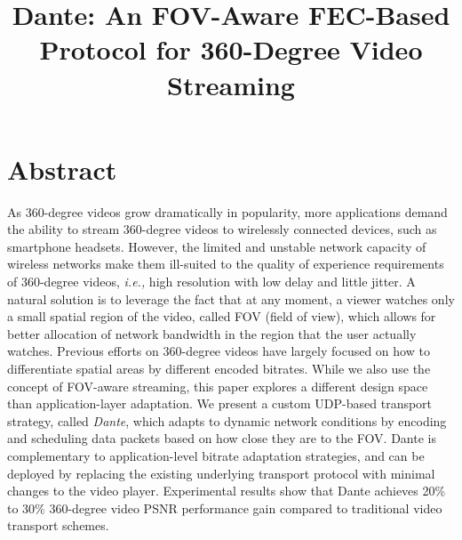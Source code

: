 \documentclass{apnet18}
\newcommand{\ie}{{\it i.e.,}\xspace}
\begin{document}
 {}
\date{}


\title{Dante: An FOV-Aware FEC-Based Protocol for 360-Degree Video Streaming}

\maketitle



	
\section*{Abstract}
As 360-degree videos grow dramatically in popularity, more 
applications demand the ability to stream 360-degree videos to 
wirelessly connected devices, such as smartphone headsets. However, 
the limited and unstable network capacity of wireless networks make 
them ill-suited to the quality of experience requirements of 
360-degree videos, \ie high resolution with low delay and little 
jitter. A natural solution is to leverage the fact that at any 
moment, a viewer watches only a small spatial region of the video, 
called FOV (field of view), which allows for better allocation of 
network bandwidth in the region that the user actually watches. 
Previous efforts on 360-degree videos have largely focused on how to 
differentiate spatial areas by different encoded bitrates. While we 
also use the concept of FOV-aware streaming, this paper explores a 
different design space than application-layer adaptation. We present 
a custom UDP-based transport strategy, called {\em Dante}, which 
adapts to dynamic network conditions by encoding and scheduling data 
packets based on how close they are to the FOV. Dante is 
complementary to application-level bitrate adaptation strategies, and
can be deployed by replacing the existing underlying transport 
protocol with minimal changes to the video player. Experimental 
results show that Dante achieves 20\% to 30\% 360-degree video PSNR performance gain compared to traditional video transport schemes.
\end{document}
